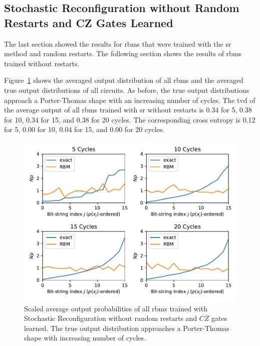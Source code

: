 \newpage

\subsection{Stochastic Reconfiguration without Random Restarts and CZ Gates Learned}

The last section showed the results for \gls{rbm}s that were trained with the \gls{sr}
method and random restarts. The following section shows the results of \gls{rbm}s trained without restarts.

Figure~\ref{fig:sr_no_restarts_avgPDF} shows the averaged output distribution of all \gls{rbm}s and
the averaged true output distributions of all circuits. As before, the 
true output distributions approach a Porter-Thomas shape with an increasing number of cycles.
The \gls{tvd} of the average output of all \gls{rbm}s trained with \gls{sr} without restarts
is 0.34 for 5, 0.38 for 10, 0.34 for 15, and 0.38 for 20 cycles. The corresponding cross entropy is 
0.12 for 5, 0.00 for 10, 0.04 for 15, and 0.00 for 20 cycles.

\begin{figure}[H] 
  \centering
  \includegraphics[width=\textwidth]{figures/results/sr-no-restarts-learned/avgPDF.pdf}
  \caption[Scaled Average Output Probabilities of All RBMs Trained with Stochastic Reconfiguration without Random Restarts and $CZ$ Gates Learned]{
    Scaled average output probabilities of all \gls{rbm}s trained with Stochastic Reconfiguration without random restarts and $CZ$ gates learned. The true 
    output distribution approaches a Porter-Thomas shape with increasing number of cycles.}
  \label{fig:sr_no_restarts_avgPDF}
\end{figure}

